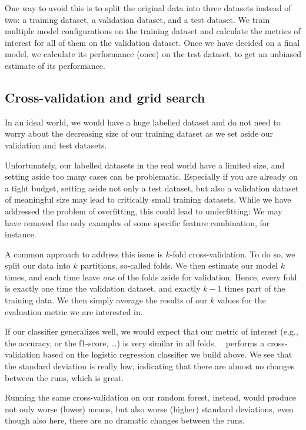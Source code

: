 One way to avoid this is to split the original data into three
datasets instead of two: a training dataset, a validation dataset, and
a test dataset.  We train multiple model configurations on the
training dataset and calculate the metrics of interest for all of them
on the validation dataset.  Once we have decided on a final model, we
calculate its performance (once) on the test dataset, to get an
unbiased estimate of its performance.



\subsection{Cross-validation and grid search}
\label{sec:crossvalidation}
In an ideal world, we would have a huge labelled dataset and do not
need to worry about the decreasing size of our training dataset as we
set aside our validation and test datasets.

Unfortunately, our labelled datasets in the real world have a limited
size, and setting aside too many cases can be problematic. Especially
if you are already on a tight budget, setting aside not only a test
dataset, but also a validation dataset of meaningful size may lead to
critically small training datasets. While we have addressed the
problem of overfitting, this could lead to underfitting: We may have
removed the only examples of some specific feature combination, for
instance.

A common approach to address this issue is $k$-fold
cross-validation. To do so, we split our data into $k$ partitions,
so-called folds. We then estimate our model $k$ times, and each time
leave \emph{one} of the folds aside for validation. Hence, every fold
is exactly one time the validation dataset, and exactly $k-1$ times
part of the training data. We then simply average the results of our
$k$ values for the evaluation metric we are interested in.

If our classifier generalizes well, we would expect that our metric of
interest (e.g., the accuracy, or the f1-score, \ldots) is very similar
in all folds. ~ performs a cross-validation based on
the logistic regression classifier we build above. We see that the
standard deviation is really low, indicating that there are almost no
changes between the runs, which is great.

Running the same cross-validation on our random forest, instead, would
produce not only worse (lower) means, but also worse (higher) standard
deviations, even though also here, there are no dramatic changes
between the runs.

